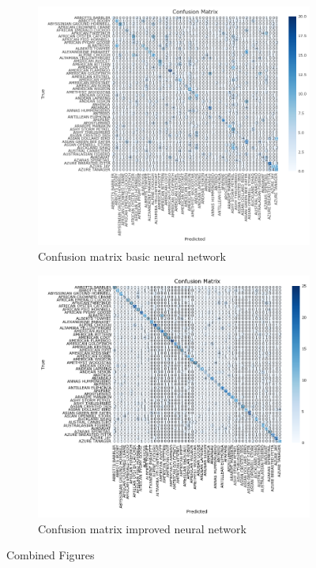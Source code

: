 \begin{figure}[h]
    \begin{subfigure}{0.5\textwidth}
        \centering
        \includegraphics[width=\linewidth]{figs/matrix_baseline.png}
        \caption{Confusion matrix basic neural network}
        \label{fig:confusion basic}
    \end{subfigure}%
    \begin{subfigure}{0.5\textwidth}
        \centering
        \includegraphics[width=\linewidth]{figs/matrix.png}
        \caption{Confusion matrix improved neural network}
        \label{fig:confusion improved}
    \end{subfigure}
    \caption{Combined Figures}
    \label{fig:combined}
\end{figure}
